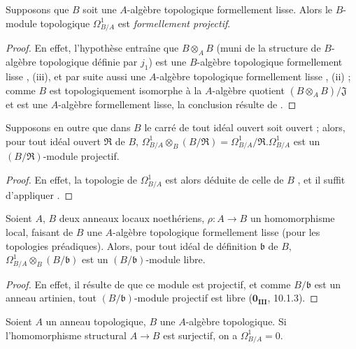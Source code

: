 \begin{theorem}[20.4.9]
\label{0.20.4.9-fr}
Supposons que $B$ soit une $A$-algèbre topologique formellement lisse. Alors
le $B$-module topologique $\Omega^1_{B/A}$ est \emph{formellement projectif}.
\end{theorem}

\begin{proof}
En effet, l'hypothèse entraîne que $B\otimes_A B$ (muni de la structure de
$B$-algèbre topologique définie par $j_1$) est une $B$-algèbre topologique
formellement lisse , (iii), et par suite aussi une
$A$-algèbre topologique formellement lisse , (ii) ; comme
$B$ est topologiquement isomorphe à la $A$-algèbre quotient
$(B\otimes_A B)/\mathfrak{J}$ et est une $A$-algèbre formellement lisse, la
conclusion résulte de .
\end{proof}

\begin{corollary}[20.4.10]
\label{0.20.4.10-fr}
Supposons en outre que dans $B$ le carré de tout idéal ouvert soit ouvert ;
alors, pour tout idéal ouvert $\mathfrak{R}$ de $B$,
$\Omega^1_{B/A}\otimes_B(B/\mathfrak{R})
=\Omega^1_{B/A}/\mathfrak{R}.\Omega^1_{B/A}$ est un
$(B/\mathfrak{R})$-module projectif.
\end{corollary}

\begin{proof}
En effet, la topologie de $\Omega^1_{B/A}$ est alors déduite de celle de
$B$ , et il suffit d'appliquer .
\end{proof}

\begin{corollary}[20.4.11]
\label{0.20.4.11-fr}
Soient $A$, $B$ deux anneaux locaux noethériens, $\rho:A\to B$ un
homomorphisme local, faisant de $B$ une $A$-algèbre topologique formellement
lisse (pour les topologies préadiques). Alors, pour tout idéal de définition
$\mathfrak{b}$ de $B$,
$\Omega^1_{B/A}\otimes_B(B/\mathfrak{b})$ est un
$(B/\mathfrak{b})$-module libre.
\end{corollary}

\begin{proof}
En effet, il résulte de  que ce module est projectif, et
comme $B/\mathfrak{b}$ est un anneau artinien, tout
$(B/\mathfrak{b})$-module projectif est libre
($\mathbf{0_{III}}$, 10.1.3).
\end{proof}

\begin{proposition}[20.4.12]
\label{0.20.4.12-fr}
Soient $A$ un anneau topologique, $B$ une $A$-algèbre topologique. Si
l'homomorphisme structural $A\to B$ est surjectif, on a
$\Omega^1_{B/A}=0$.
\end{proposition}

